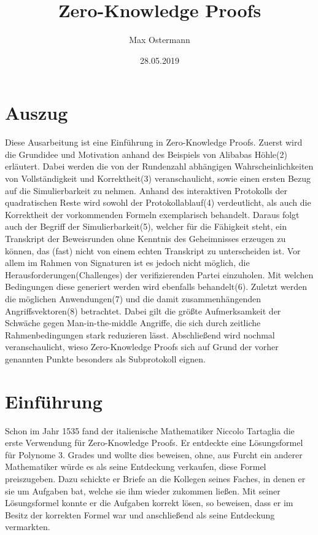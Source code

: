 \documentclass {article}
\title{Zero-Knowledge Proofs}
\author{Max Ostermann}
\date{28.05.2019}
\begin{document}
\maketitle
{}
\newpage
{}

\section{Auszug}
Diese Ausarbeitung ist eine Einführung in Zero-Knowledge Proofs.
Zuerst wird die Grundidee und Motivation anhand des Beispiels von Alibabas H\"ohle(2) erl\"autert. Dabei werden die von der Rundenzahl abh\"angigen Wahrscheinlichkeiten von Vollst\"andigkeit und Korrektheit(3) veranschaulicht, sowie einen ersten Bezug auf die Simulierbarkeit zu nehmen. Anhand des interaktiven Protokolls der quadratischen Reste wird sowohl der Protokollablauf(4) verdeutlicht, als auch die Korrektheit der vorkommenden Formeln exemplarisch behandelt. Daraus folgt auch der Begriff der Simulierbarkeit(5), welcher für die F\"ahigkeit steht, ein Transkript der Beweisrunden ohne Kenntnis des Geheimnisses erzeugen zu können, das (fast) nicht von einem echten Transkript zu unterscheiden ist. Vor allem im Rahmen von Signaturen ist es jedoch nicht m\"oglich, die Herausforderungen(Challenges) der verifizierenden Partei einzuholen. Mit welchen Bedingungen diese generiert werden wird ebenfalls behandelt(6). 
Zuletzt werden die m\"oglichen Anwendungen(7) und die damit zusammenh\"angenden Angriffsvektoren(8) betrachtet. Dabei gilt die gr\"oßte Aufmerksamkeit der Schw\"ache gegen Man-in-the-middle Angriffe, die sich durch zeitliche Rahmenbedingungen stark reduzieren l\"asst. Abschlie\ss{}end wird nochmal veranschaulicht, wieso Zero-Knowledge Proofs sich auf Grund der vorher genannten Punkte besonders als Subprotokoll eignen.


\newpage

\tableofcontents

\newpage 

\section{Einf\"uhrung}

Schon im Jahr 1535 fand der italienische Mathematiker Niccolo Tartaglia die erste Verwendung für Zero-Knowledge Proofs. Er entdeckte eine Lösungsformel für Polynome 3. Grades und wollte dies beweisen, ohne, aus Furcht ein anderer Mathematiker würde es als seine Entdeckung verkaufen, diese Formel preiszugeben. Dazu schickte er Briefe an die Kollegen seines Faches, in denen er sie um Aufgaben bat, welche sie ihm wieder zukommen lie\ss{}en. Mit seiner L\"osungsformel konnte er die Aufgaben korrekt l\"osen, so beweisen, dass er im Besitz der korrekten Formel war und anschlie\ss{}end als seine Entdeckung vermarkten. \\
\end{document}

